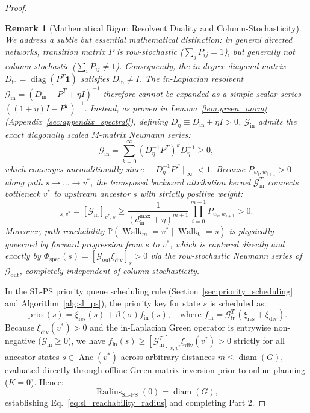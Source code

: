 \documentclass[11pt,a4paper]{article}
\newtheorem{remark}{Remark}
\begin{document}
\begin{proof}
\begin{remark}[Mathematical Rigor: Resolvent Duality and Column-Stochasticity]
We address a subtle but essential mathematical distinction: in general directed networks, transition matrix $P$ is row-stochastic ($\sum_j P_{ij} = 1$), but generally \textit{not} column-stochastic ($\sum_i P_{ij} \ne 1$). Consequently, the in-degree diagonal matrix $D_{\text{in}} = \operatorname{diag}(P^T \mathbf{1})$ satisfies $D_{\text{in}} \ne I$. The in-Laplacian resolvent $\mathcal{G}_{\text{in}} = (D_{\text{in}} - P^T + \eta I)^{-1}$ therefore cannot be expanded as a simple scalar series $((1+\eta)I - P^T)^{-1}$. 
Instead, as proven in Lemma~\ref{lem:green_norm} (Appendix~\ref{sec:appendix_spectral}), defining $D_\eta \equiv D_{\text{in}} + \eta I > 0$, $\mathcal{G}_{\text{in}}$ admits the exact diagonally scaled M-matrix Neumann series:
\begin{equation}
\label{eq:gin_m_matrix_expansion}
\mathcal{G}_{\text{in}} = \sum_{k=0}^\infty (D_\eta^{-1} P^T)^k D_\eta^{-1} \ge 0,
\end{equation}
which converges unconditionally since $\|D_\eta^{-1} P^T\|_\infty < 1$. Because $P_{w_i, w_{i+1}} > 0$ along path $s \to \dots \to v^*$, the transposed backward attribution kernel $\mathcal{G}_{\text{in}}^T$ connects bottleneck $v^*$ to upstream ancestor $s$ with strictly positive weight:
\begin{equation}
[\mathcal{G}_{\text{in}}^T]_{s, v^*} = [\mathcal{G}_{\text{in}}]_{v^*, s} \ge \frac{1}{(d_{\text{in}}^{\max} + \eta)^{m+1}} \prod_{i=0}^{m-1} P_{w_i, w_{i+1}} > 0.
\end{equation}
Moreover, path reachability $\mathbb{P}(\operatorname{Walk}_m = v^* \mid \operatorname{Walk}_0 = s)$ is physically governed by forward progression from $s$ to $v^*$, which is captured directly and exactly by $\Phi_{\text{spec}}(s) = [\mathcal{G}_{\text{out}} \xi_{\text{div}}]_s > 0$ via the row-stochastic Neumann series of $\mathcal{G}_{\text{out}}$, completely independent of column-stochasticity.
\end{remark}

In the SL-PS priority queue scheduling rule (Section~\ref{sec:priority_scheduling} and Algorithm~\ref{alg:sl_ps}), the priority key for state $s$ is scheduled as:
\begin{equation}
\operatorname{prio}(s) = \xi_{\text{res}}(s) + \beta(\sigma) f_{\text{in}}(s), \quad \text{where } f_{\text{in}} = \mathcal{G}_{\text{in}}^T(\xi_{\text{res}} + \xi_{\text{div}}).
\end{equation}
Because $\xi_{\text{div}}(v^*) > 0$ and the in-Laplacian Green operator is entrywise non-negative ($\mathcal{G}_{\text{in}} \ge 0$), we have $f_{\text{in}}(s) \ge [\mathcal{G}_{\text{in}}^T]_{s, v^*} \xi_{\text{div}}(v^*) > 0$ strictly for all ancestor states $s \in \operatorname{Anc}(v^*)$ across arbitrary distances $m \le \operatorname{diam}(G)$, evaluated directly through offline Green matrix inversion prior to online planning ($K = 0$). Hence:
\begin{equation}
\operatorname{Radius}_{\text{SL-PS}}(0) = \operatorname{diam}(G),
\end{equation}
establishing Eq.~\eqref{eq:sl_reachability_radius} and completing Part 2.


\end{proof}
\end{document}
